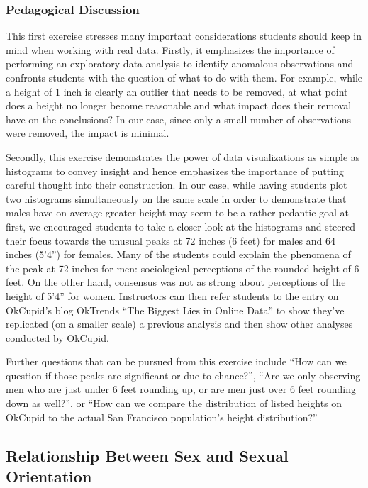 \documentclass{article}\usepackage[]{graphicx}\usepackage[]{color}
\begin{document}
\subsubsection{Pedagogical Discussion}
This first exercise stresses many important considerations students should keep in mind when working with real data.  Firstly, it emphasizes the importance of performing an exploratory data analysis to identify anomalous observations and confronts students with the question of what to do with them.  For example, while a height of 1 inch is clearly an outlier that needs to be removed, at what point does a height no longer become reasonable and what impact does their removal have on the conclusions?  In our case, since only a small number of observations were removed, the impact is minimal.

Secondly, this exercise demonstrates the power of data visualizations as simple as histograms to convey insight and hence emphasizes the importance of putting careful thought into their construction.  In our case, while having students plot two histograms simultaneously on the same scale in order to demonstrate that males have on average greater height may seem to be a rather pedantic goal at first, we encouraged students to take a closer look at the histograms and steered their focus towards the unusual peaks at 72 inches (6 feet) for males and 64 inches (5'4'') for females.  Many of the students could explain the phenomena of the peak at 72 inches for men: sociological perceptions of the rounded height of 6 feet.  On the other hand, consensus was not as strong about perceptions of the height of 5'4'' for women.  Instructors can then refer students to the entry on OkCupid's blog OkTrends ``The Biggest Lies in Online Data''\cite{OkTrendsLies} to show they've replicated (on a smaller scale) a previous analysis and then show other analyses conducted by OkCupid.

Further questions that can be pursued from this exercise include ``How can we question if those peaks are significant or due to chance?'', ``Are we only observing men who are just under 6 feet rounding up, or are men just over 6 feet rounding down as well?'', or ``How can we compare the distribution of listed heights on OkCupid to the actual San Francisco population's height distribution?''







\subsection{Relationship Between Sex and Sexual Orientation}\label{sex_by_sexual_orientation}
\end{document}
